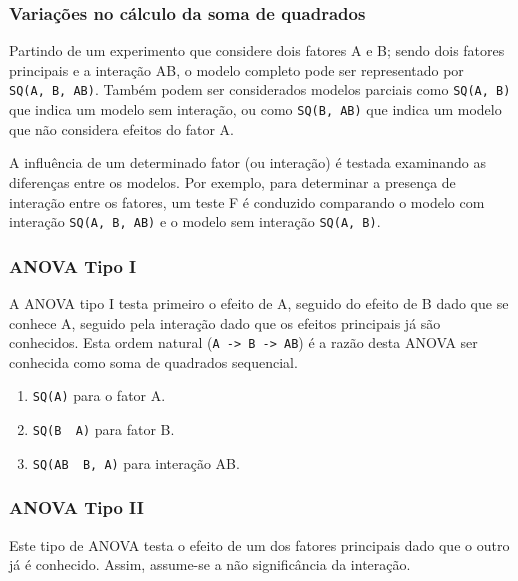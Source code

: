 \documentclass[
]{article}
\providecommand{\tightlist}{%
  \setlength{\itemsep}{0pt}\setlength{\parskip}{0pt}}
\begin{document}
\hypertarget{variauxe7uxf5es-no-cuxe1lculo-da-soma-de-quadrados}{%
\subsubsection{Variações no cálculo da soma de quadrados}\label{variauxe7uxf5es-no-cuxe1lculo-da-soma-de-quadrados}}

Partindo de um experimento que considere dois fatores A e B; sendo dois fatores principais e a interação AB, o modelo completo pode ser representado por \texttt{SQ(A,\ B,\ AB)}. Também podem ser considerados modelos parciais como \texttt{SQ(A,\ B)} que indica um modelo sem interação, ou como \texttt{SQ(B,\ AB)} que indica um modelo que não considera efeitos do fator A.

A influência de um determinado fator (ou interação) é testada examinando as diferenças entre os modelos. Por exemplo, para determinar a presença de interação entre os fatores, um teste F é conduzido comparando o modelo com interação \texttt{SQ(A,\ B,\ AB)} e o modelo sem interação \texttt{SQ(A,\ B)}.

\hypertarget{anova-tipo-i}{%
\subsubsection{ANOVA Tipo I}\label{anova-tipo-i}}

A ANOVA tipo I testa primeiro o efeito de A, seguido do efeito de B dado que se conhece A, seguido pela interação dado que os efeitos principais já são conhecidos. Esta ordem natural (\texttt{A\ -\textgreater{}\ B\ -\textgreater{}\ AB}) é a razão desta ANOVA ser conhecida como soma de quadrados sequencial.

\begin{enumerate}
\def\labelenumi{\arabic{enumi}.}
\tightlist
\item
  \texttt{SQ(A)} para o fator A.
\item
  \texttt{SQ(B\ \textbar{}\ A)} para fator B.
\item
  \texttt{SQ(AB\ \textbar{}\ B,\ A)} para interação AB.
\end{enumerate}

\hypertarget{anova-tipo-ii}{%
\subsubsection{ANOVA Tipo II}\label{anova-tipo-ii}}

Este tipo de ANOVA testa o efeito de um dos fatores principais dado que o outro já é conhecido. Assim, assume-se a não significância da interação.
\end{document}
